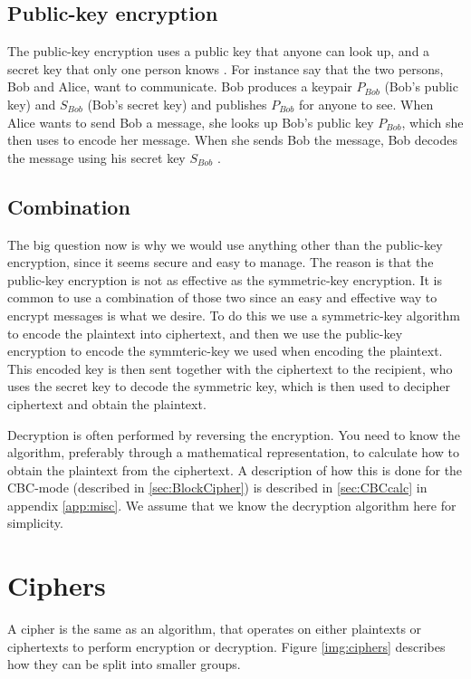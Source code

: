 \subsection{Public-key encryption}
The public-key encryption uses a public key that anyone can look up, and a 
secret key that only one person knows \citep[pp. 25--32]{Simmons:1992}.
For instance say that the two persons, Bob and Alice, want to communicate. 
Bob produces a keypair \(P_{Bob}\) (Bob’s public key) and \(S_{Bob}\) 
(Bob’s secret key) and publishes \(P_{Bob}\) for anyone to see. When Alice wants 
to send Bob a message, she looks up Bob’s public key \(P_{Bob}\), which she then 
uses to encode her message. When she sends Bob the message, Bob decodes the 
message using his secret key \(S_{Bob}\) \citep{Schneier:2003}.

\subsection{Combination}
The big question now is why we would use anything other than the public-key
encryption, since it seems secure and easy to manage. The reason is that the 
public-key encryption is not as effective as the symmetric-key encryption. 
It is common to use a combination of those two since an easy and effective way 
to encrypt messages is what we desire. To do this we use a symmetric-key 
algorithm to encode the plaintext into ciphertext, and then we use the 
public-key encryption to encode the symmteric-key we used when encoding the 
plaintext. This encoded key is then sent together with the ciphertext to the 
recipient, who uses the secret key to decode the symmetric key, which is then used to decipher ciphertext and obtain the plaintext.

Decryption is often performed by reversing the encryption. You need to know the 
algorithm, preferably through a mathematical representation, to calculate how 
to obtain the plaintext from the ciphertext. A description of how this is done 
for the CBC-mode (described in \ref{sec:BlockCipher}) is described in 
\ref{sec:CBCcalc} in appendix \ref{app:misc}. We assume that we know the 
decryption algorithm here for simplicity. 

\section{Ciphers}
A cipher is the same as an algorithm, that operates on either plaintexts or 
ciphertexts to perform encryption or decryption. Figure \ref{img:ciphers} 
describes how they can be split into smaller groups.

